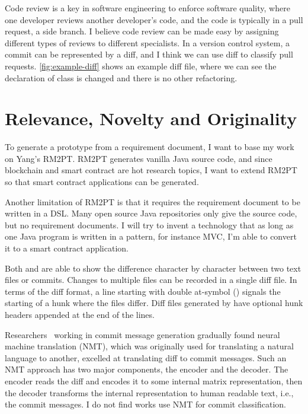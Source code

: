 Code review is a key in software engineering to enforce software quality, where one developer reviews another developer's code, and the code is typically in a pull request, a side branch.
I believe code review can be made easy by assigning different types of reviews to different specialists. In a version control system, a commit can be represented by a diff, and I think we can use diff to classify pull requests. \autoref{fig:example-diff} shows an example diff file, where we can see the declaration of class  is changed and there is no other refactoring.


\section{Relevance, Novelty and Originality}

To generate a prototype from a requirement document, I want to base my work on Yang's RM2PT. RM2PT generates vanilla Java source code, and since blockchain and smart contract are hot research topics, I want to extend RM2PT so that smart contract applications can be generated.

Another limitation of RM2PT is that it requires the requirement document to be written in a DSL. Many open source Java repositories only give the source code, but no requirement documents.
I will try to invent a technology that as long as one Java program is written in a pattern, for instance MVC, I'm able to convert it to a smart contract application.

Both {\gnudiff} and {\gitdiff} are able to show the difference character by character between two text files or commits.
Changes to multiple files can be recorded in a single diff file.
In terms of the diff format, a line starting with double at-symbol () signals the starting of a hunk where the files differ.
Diff files generated by {\gitdiff} have optional hunk headers appended at the end of the  lines.


Researchers~\cite{xu2019commit,liu2019generating} working in commit message generation gradually found neural machine translation (NMT),
which was originally used for translating a natural language to another,
excelled at translating diff to commit messages.
Such an NMT approach has two major components, the encoder and the decoder.
The encoder reads the diff and encodes it to some internal matrix representation,
then the decoder transforms the internal representation to human readable text, i.e., the commit messages.
I do not find works use NMT for commit classification.



